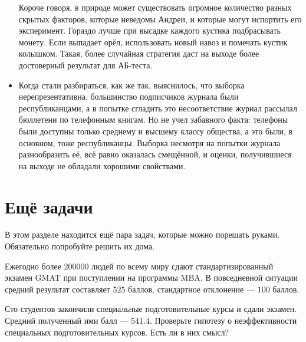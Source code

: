 \documentclass[12pt, a4paper, oneside]{article}
\theoremstyle{plain} %
\theoremstyle{definition}
\newcounter{problem}%
\renewcommand{\theproblem}{\arabic{problem}}
\newenvironment{problem}[1]{
\addtocounter{problem}{1}\noindent{ \color{titleblue} \large \bfseries Упражнение~\theproblem~#1 \vspace{1ex} \newline}
}{ }
\begin{document}
\begin{solution}
\begin{itemize}
	Короче говоря, в природе может существовать огромное количество разных скрытых факторов, которые неведомы Андреи, и которые могут испортить его эксперимент. Гораздо лучше при высадке каждого кустика подбрасывать монету. Если выпадает орёл, использовать новый навоз и помечать кустик колышком. Такая, более случайная стратегия даст на выходе более достоверный результат для АБ-теста. 
	
	\item Когда стали разбираться, как же так, выяснилось, что выборка нерепрезентативна, большинство подписчиков журнала были республиканцами, а в попытке сгладить это несоответствие журнал рассылал бюллетени по телефонным книгам. Но не учел забавного факта: телефоны были доступны только среднему и высшему классу общества, а это были, в основном, тоже республиканцы. Выборка несмотря на попытки журнала разнообразить её, всё равно оказалась смещённой, и оценки, получившиеся на выходе не обладали хорошими свойствами. 
\end{itemize}
\end{solution}


\section*{Ещё задачи}

В этом разделе находится ещё пара задач, которые можно порешать руками. Обязательно попробуйте решить их дома.

\begin{problem}{(экзамены)}
Ежегодно более  $200000$  людей по всему миру сдают стандартизированный экзамен GMAT при поступлении на программы MBA. В повседневной ситуации средний результат составляет  $525$  баллов, стандартное отклонение --- $100$ баллов.

Сто студентов закончили специальные подготовительные курсы и сдали экзамен. Средний полученный ими балл —  $541.4$. Проверьте гипотезу о неэффективности специальных подготовительных курсов. Есть ли в них смысл? 
\end{problem}
\end{document}
